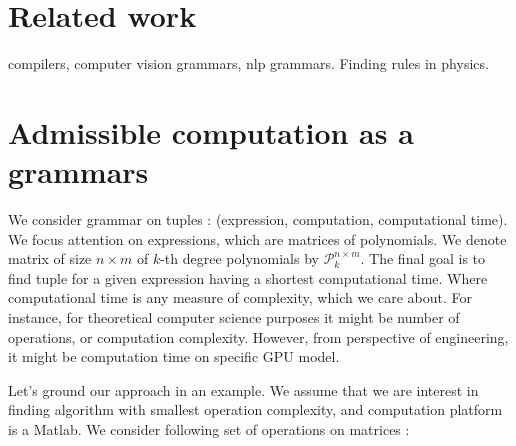 \documentclass{article}
\begin{document}
\section{Related work} \label{relatedwork}

compilers, computer vision grammars, nlp grammars. Finding rules in physics.

\section{Admissible computation as a grammars}\label{sec:grammars}

We consider grammar on tuples : (expression, computation, computational time). We focus attention on expressions, which are matrices
of polynomials. We denote matrix of size $n \times m$ of $k$-th degree polynomials by $\mathcal{P}^{n \times m}_k$. 
The final goal is to find tuple for a given 
expression having a shortest computational time. Where computational time is any measure of complexity, which
we care about. For instance, for theoretical computer science purposes it might be number of operations, or computation complexity. However, from
perspective of engineering, it might be computation time on specific GPU model. 


Let's ground our approach in an example. We assume that we are interest in finding algorithm with smallest operation complexity, and computation platform is a Matlab.
We consider following set of operations on matrices : 
\end{document}
